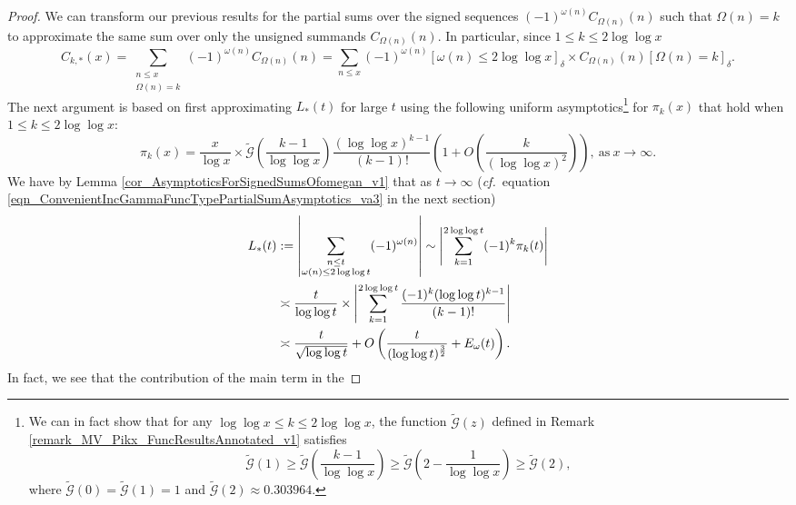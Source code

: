 \documentclass[11pt,reqno,a4letter]{article}
\numberwithin{figure}{section}
\numberwithin{table}{section}
\newcommand{\cf}{\textit{cf.\ }}
\newcommand{\Iverson}[1]{\ensuremath{\left[#1\right]_{\delta}}}
\theoremstyle{plain}
\numberwithin{theorem}{section}
\theoremstyle{definition}
\begin{document}
\begin{proof}
We can transform our previous results for the partial sums over the signed sequences 
$(-1)^{\omega(n)} C_{\Omega(n)}(n)$ such that $\Omega(n) = k$ to approximate 
the same sum over only the unsigned summands $C_{\Omega(n)}(n)$. 
In particular, since $1 \leq k \leq 2\log\log x$ 
\[
\widehat{C}_{k,\ast}(x) = 
     \sum_{\substack{n \leq x \\ \Omega(n)=k}} (-1)^{\omega(n)} C_{\Omega(n)}(n) = 
     \sum_{n \leq x} (-1)^{\omega(n)} \Iverson{\omega(n) \leq 2\log\log x} \times 
     C_{\Omega(n)}(n) \Iverson{\Omega(n) = k}. 
\]
The next argument is based on first approximating $L_{\ast}(t)$ for large $t$ 
using the following uniform asymptotics\footnote{
     We can in fact show that for any $\log\log x \leq k \leq 2\log\log x$, 
     the function $\widetilde{\mathcal{G}}(z)$ defined in 
     Remark \ref{remark_MV_Pikx_FuncResultsAnnotated_v1} satisfies 
     \[ 
     \widetilde{\mathcal{G}}(1) \geq \widetilde{\mathcal{G}}\left(\frac{k-1}{\log\log x}\right) \geq 
          \widetilde{\mathcal{G}}\left(2-\frac{1}{\log\log x}\right) \geq 
          \widetilde{\mathcal{G}}(2),  
     \]
     where $\widetilde{\mathcal{G}}(0) = \widetilde{\mathcal{G}}(1) = 1$ and 
     $\widetilde{\mathcal{G}}(2) \approx 0.303964$. 
} 
for $\pi_k(x)$ that hold when $1 \leq k \leq 2\log\log x$:
\[
\pi_k(x) = \frac{x}{\log x} \times \widetilde{\mathcal{G}}\left(\frac{k-1}{\log\log x}\right) 
     \frac{(\log\log x)^{k-1}}{(k-1)!} \left(1 + 
     O\left(\frac{k}{(\log\log x)^2}\right)\right), 
     \mathrm{\ as\ } x \rightarrow \infty. 
\]
We have by Lemma \ref{cor_AsymptoticsForSignedSumsOfomegan_v1} that as $t \rightarrow \infty$ 
(\cf equation \eqref{eqn_ConvenientIncGammaFuncTypePartialSumAsymptotics_va3} in the next section) 
\begin{align} 
\notag 
L_{\ast}(t) & := \left\lvert \sum_{\substack{n \leq t \\ \omega(n) \leq 2\log\log t}} 
     (-1)^{\omega(n)} \right\rvert \sim 
     \left\lvert \sum_{k=1}^{2\log\log t} (-1)^{k} \pi_k(t) \right\rvert \\ 
\notag 
     & \asymp \frac{t}{\log\log t} \times \left\lvert 
     \sum_{k=1}^{2\log\log t} \frac{(-1)^{k} (\log\log t)^{k-1}}{(k-1)!} \right\rvert \\ 
\label{eqn_ProofTag_LAsttSummatoryFuncAsymptotics_v1}
     & \asymp 
     \frac{t}{\sqrt{\log\log t}} + O\left(\frac{t}{(\log\log t)^{\frac{3}{2}}} + E_{\omega}(t)\right). 
\end{align} 
In fact, we see that the contribution of the main term in the 

\end{proof}
\end{document}
